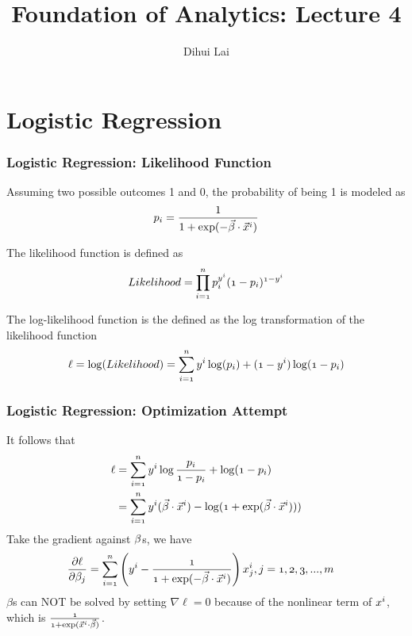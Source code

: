 \documentclass[notheorems, aspectratio=54]{beamer}
\title{Foundation of Analytics: Lecture 4}
\author{Dihui Lai}
\institute[WUSTL]{dlai@wustl.edu}
\begin{document}
\begin{frame}
    \titlepage
\end{frame}

\section{Logistic Regression}

\begin{frame}

\frametitle{Logistic Regression: Likelihood Function}
Assuming two possible outcomes 1 and 0, the probability of being 1 is modeled as $$\mathnormal{p_i}=\frac{1}{1+\mathnormal{\exp(-\vec{\beta}\cdot\vec{x}^i)}}$$

The likelihood function is defined as 
\begin{align*}
\mathnormal{Likelihood}&=\mathnormal{\prod_{i=1}^{n}p_{i}^{y^i}(1-p_{i})^{1-y^{i}}}\\
\end{align*}

The log-likelihood function is the defined as the log transformation of the likelihood function
\begin{align*}
\mathnormal{\ell}=\mathnormal{\log(Likelihood)}
&=\mathnormal{\sum_{i=1}^{n}y^i\log(p_i)+(1-y^i)\log(1-p_i)}\\
\end{align*}

\end{frame}


\begin{frame}

\frametitle{Logistic Regression: Optimization Attempt}
It follows that
\begin{align*}
\mathnormal{\ell}&=\mathnormal{\sum_{i=1}^{n}y^i\log\frac{p_i}{1-p_i}+\log(1-p_i)}\\
&=\mathnormal{\sum_{i=1}^{n}y^i(\vec{\beta}\cdot\vec{x}^i)-\log(1+\exp(\vec{\beta}\cdot\vec{x}^i)))}
\end{align*}
Take the gradient against $\mathnormal{\beta}$s, we have
\begin{align*}
\mathnormal{\frac{\partial\ell}{\partial\beta_j}}
&=\mathnormal{\sum_{i=1}^{n}\left (y^i-\frac{1}{1+\exp(-\vec{\beta}\cdot\vec{x}^i)} \right) x_{j}^{i}}, \mathnormal{j=1, 2, 3, ...,m}
\end{align*}
$\beta$s can NOT be solved by setting $\nabla\ell=0$ because of the nonlinear term of $\mathnormal{x^i}$, which is $\mathnormal{\frac{1}{1+\exp(\vec{x}^i\cdot\vec{\beta})}}$.
\end{frame}
\end{document}
